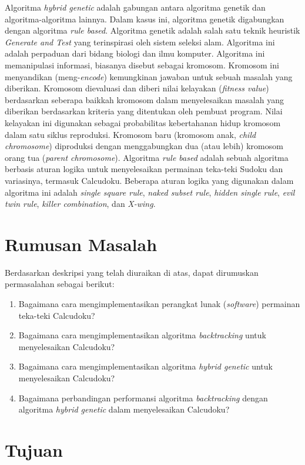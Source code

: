 \documentclass[a4paper,twoside]{article}
\begin{document}
Algoritma \textit{hybrid genetic} adalah gabungan antara algoritma genetik dan algoritma-algoritma lainnya. Dalam kasus ini, algoritma genetik digabungkan dengan algoritma \textit{rule based}. Algoritma genetik adalah salah satu teknik heuristik \textit{Generate and Test} yang terinspirasi oleh sistem seleksi alam. Algoritma ini adalah perpaduan dari bidang biologi dan ilmu komputer. Algoritma ini memanipulasi informasi, biasanya disebut sebagai kromosom. Kromosom ini menyandikan (meng-\textit{encode}) kemungkinan jawaban untuk sebuah masalah yang diberikan. Kromosom dievaluasi dan diberi nilai kelayakan (\textit{fitness value}) berdasarkan seberapa baikkah kromosom dalam menyelesaikan masalah yang diberikan berdasarkan kriteria yang ditentukan oleh pembuat program. Nilai kelayakan ini digunakan sebagai probabilitas kebertahanan hidup kromosom dalam satu siklus reproduksi. Kromosom baru (kromosom anak, \textit{child chromosome}) diproduksi dengan menggabungkan dua (atau lebih) kromosom orang tua (\textit{parent chromosome}). Algoritma \textit{rule based} adalah sebuah algoritma berbasis aturan logika untuk menyelesaikan permainan teka-teki Sudoku dan variasinya, termasuk Calcudoku. Beberapa aturan logika yang digunakan dalam algoritma ini adalah \textit{single square rule}, \textit{naked subset rule}, \textit{hidden single rule}, \textit{evil twin rule}, \textit{killer combination}, dan \textit{X-wing}. \cite{JohannaLukasSaputra}

\section{Rumusan Masalah}

Berdasarkan deskripsi yang telah diuraikan di atas, dapat dirumuskan permasalahan sebagai berikut:
\begin{enumerate}
\item Bagaimana cara mengimplementasikan perangkat lunak (\textit{software}) permainan teka-teki Calcudoku?
\item Bagaimana cara mengimplementasikan algoritma \textit{backtracking} untuk menyelesaikan Calcudoku?
\item Bagaimana cara mengimplementasikan algoritma \textit{hybrid genetic} untuk menyelesaikan Calcudoku?
\item Bagaimana perbandingan performansi algoritma \textit{backtracking} dengan algoritma \textit{hybrid genetic} dalam menyelesaikan Calcudoku?
\end{enumerate}

\section{Tujuan}
\end{document}
